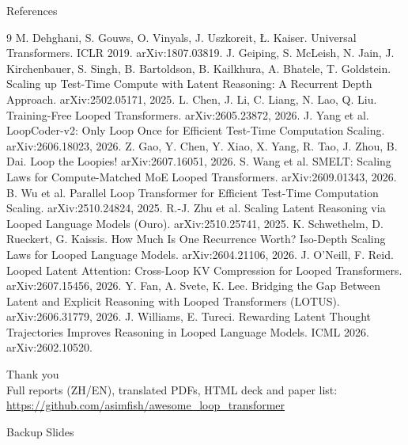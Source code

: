 \documentclass[aspectratio=169,10pt]{beamer}
\begin{document}
\begin{frame}[allowframebreaks]{References}
  \small
  \begin{thebibliography}{9}
     M. Dehghani, S. Gouws, O. Vinyals, J. Uszkoreit, \L. Kaiser. Universal Transformers. ICLR 2019. arXiv:1807.03819.
     J. Geiping, S. McLeish, N. Jain, J. Kirchenbauer, S. Singh, B. Bartoldson, B. Kailkhura, A. Bhatele, T. Goldstein. Scaling up Test-Time Compute with Latent Reasoning: A Recurrent Depth Approach. arXiv:2502.05171, 2025.
     L. Chen, J. Li, C. Liang, N. Lao, Q. Liu. Training-Free Looped Transformers. arXiv:2605.23872, 2026.
     J. Yang et al. LoopCoder-v2: Only Loop Once for Efficient Test-Time Computation Scaling. arXiv:2606.18023, 2026.
     Z. Gao, Y. Chen, Y. Xiao, X. Yang, R. Tao, J. Zhou, B. Dai. Loop the Loopies! arXiv:2607.16051, 2026.
     S. Wang et al. SMELT: Scaling Laws for Compute-Matched MoE Looped Transformers. arXiv:2609.01343, 2026.
     B. Wu et al. Parallel Loop Transformer for Efficient Test-Time Computation Scaling. arXiv:2510.24824, 2025.
     R.-J. Zhu et al. Scaling Latent Reasoning via Looped Language Models (Ouro). arXiv:2510.25741, 2025.
     K. Schwethelm, D. Rueckert, G. Kaissis. How Much Is One Recurrence Worth? Iso-Depth Scaling Laws for Looped Language Models. arXiv:2604.21106, 2026.
     J. O'Neill, F. Reid. Looped Latent Attention: Cross-Loop KV Compression for Looped Transformers. arXiv:2607.15456, 2026.
     Y. Fan, A. Svete, K. Lee. Bridging the Gap Between Latent and Explicit Reasoning with Looped Transformers (LOTUS). arXiv:2606.31779, 2026.
     J. Williams, E. Tureci. Rewarding Latent Thought Trajectories Improves Reasoning in Looped Language Models. ICML 2026. arXiv:2602.10520.
  \end{thebibliography}
\end{frame}

\begin{frame}
  \centering
  {\Large Thank you}\\[10pt]
  {\small Full reports (ZH/EN), translated PDFs, HTML deck and paper list:}\\
  \url{https://github.com/asimfish/awesome_loop_transformer}
\end{frame}

\appendix
\begin{frame}{Backup Slides}\end{frame}
\end{document}
